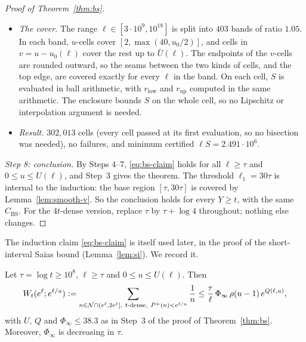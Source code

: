 \begin{proof}[Proof of Theorem~\ref{thm:bs}]
\begin{itemize}
  bounds, satisfies $S\le\Sigma$. Here the masses $\pi([u-1,u])=1-1/(ur)$ and $\pi([u,\infty))=1/(ur)$, and
  $\int_{u-1}^u\rho(w-1)\,dw=(u-1)\rho(u-1)$, come from \ref{R1}; on $w\ge u$, $\pi(dw)\le e^{-r_0(w-u)}dw/u$ by \ref{R3}; and
  $(1+w)/w\le u/(u-1)$ for $w\ge u-1$. Also $\bar\eta\ge\eta_f$, because $\kappa_\Phi\le\kappa_{\max}$, $m\ge\ell/2$,
  $(1+w)/w\le2$ and $((1+w)/w)^{3/2}\le2k_u$ for $w\ge u-1\ge1$, and $(w-m^{1/4})_+\le(w-u_0+c_u)_+$. Since $\bar\eta$ is
  increasing in both arguments, its values at $(u,v)$, $(u+S_1,v+S_1)$ and $(\bar U,\bar U-u_0)$ bound $\eta_f$ on $[u-1,u]$,
  $[u,u+S_1]$ and $[u+S_1,\bar U]$. The code is \texttt{bs\_cert\_arb.py} (Appendix~\ref{app:cert-bs}).
\item \emph{The cover.} The range $\ell\in[3\cdot10^9,10^{18}]$ is split into $403$ bands of ratio $1.05$. In each band,
  $u$-cells cover $[2,\max(40,u_0/2)]$, and cells in $v=u-u_0(\ell)$ cover the rest up to $\bar U(\ell)$. The endpoints of
  the $v$-cells are rounded outward, so the seams between the two kinds of cells, and the top edge, are covered exactly
  for every $\ell$ in the band. On each cell, $S$ is evaluated in ball arithmetic, with $r_{\mathrm{low}}$ and $r_{\mathrm{up}}$
  computed in the same arithmetic. The enclosure bounds $S$ on the whole cell, so no Lipschitz or interpolation argument is
  needed.
\item \emph{Result.} $302{,}013$ cells (every cell passed at its first evaluation, so no bisection was needed), no failures, and minimum certified $\ell S=2.491\cdot10^6$.
\end{itemize}

\emph{Step 8: conclusion.} By Steps 4--7, \eqref{eq:bs-claim} holds for all $\ell\ge\tau$ and $0\le u\le U(\ell)$, and
Step~3 gives the theorem. The threshold $\ell_1=30\tau$ is internal to the induction: the base region $[\tau,30\tau]$ is
covered by Lemma~\ref{lem:smooth-v}. So the conclusion holds for every $Y\ge t$, with the same $C_{\mathrm{BS}}$. For the
$4t$-dense version, replace $\tau$ by $\tau+\log4$ throughout; nothing else changes.
\end{proof}

The induction claim \eqref{eq:bs-claim} is itself used later, in the proof of the short-interval Saias bound
(Lemma~\ref{lem:si}). We record it.

\begin{lemma}[BS-profile]\label{lem:bs-profile}
Let $\tau=\log t\ge10^8$, $\ell\ge\tau$ and $0\le u\le U(\ell)$. Then
\[
  W_t(e^\ell;e^{\ell/u}):=\sum_{n\in\NN\cap(e^\ell,2e^\ell],\ t\text{-dense},\ \Pplus(n)<e^{\ell/u}}\frac1n
  \le\frac\tau\ell\,\Phi_\infty\,\rho(u-1)\,e^{Q(\ell,u)},
\]
with $U$, $Q$ and $\Phi_\infty\le38.3$ as in Step~3 of the proof of Theorem~\ref{thm:bs}. Moreover, $\Phi_\infty$ is
decreasing in $\tau$.
\end{lemma}

